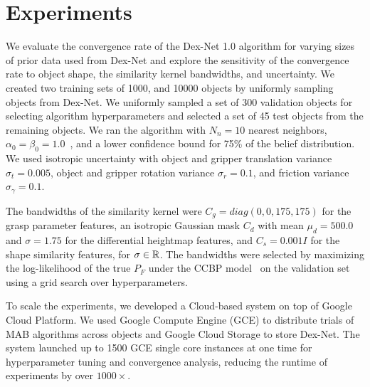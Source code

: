 \section{Experiments}


We evaluate the convergence rate of the Dex-Net 1.0 algorithm for varying sizes of prior data used from Dex-Net and explore the sensitivity of the convergence rate to object shape, the similarity kernel bandwidths, and uncertainty.
We created two training sets of 1000, and 10000 objects by uniformly sampling objects from Dex-Net.
We uniformly sampled a set of 300 validation objects for selecting algorithm hyperparameters and selected a set of 45 test objects from the remaining objects.
We ran the algorithm with $N_n = 10$ nearest neighbors, $\alpha_0 = \beta_0 = 1.0$~\cite{laskey2015bandits}, and a lower confidence bound for 75\% of the belief distribution.
We used isotropic uncertainty with object and gripper translation variance $\sigma_{t} = 0.005$, object and gripper rotation variance $\sigma_{r} = 0.1$, and friction variance $\sigma_{\gamma} = 0.1$.

The bandwidths of the similarity kernel were $C_g = diag(0,0,175, 175)$ for the grasp parameter features, an isotropic Gaussian mask $C_d$ with mean $\mu_d = 500.0$ and $\sigma = 1.75$ for the differential heightmap features, and $C_s = 0.001 I$ for the shape similarity features, for $\sigma \in \mathbb{R}$.
The bandwidths were selected by maximizing the log-likelihood of the true $P_F$ under the CCBP model~\cite{goetschalckx2011continuous} on the validation set using a grid search over hyperparameters.

To scale the experiments, we developed a Cloud-based system on top of Google Cloud Platform.
We used Google Compute Engine (GCE) to distribute trials of MAB algorithms across objects and Google Cloud Storage to store Dex-Net.
The system launched up to 1500 GCE single core instances at one time for hyperparameter tuning and convergence analysis, reducing the runtime of experiments by over $1000\times$.

